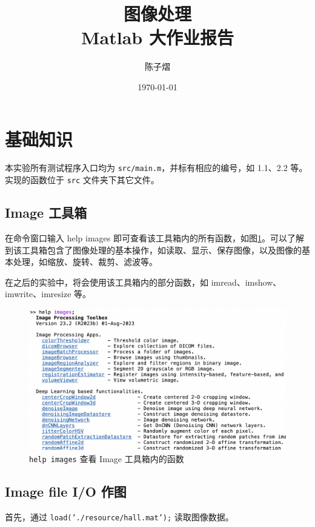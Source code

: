 \documentclass[a4paper]{article}  %
\begin{document}
\title{\textbf{图像处理}\\Matlab 大作业报告}  %
\author{陈子熠}
\date{\today}
\maketitle

\tableofcontents

\newpage

\section{基础知识}

本实验所有测试程序入口均为 \texttt{src/main.m}，并标有相应的编号，如 1.1、2.2 等。实现的函数位于 \texttt{src} 文件夹下其它文件。

\subsection{Image 工具箱}

在命令窗口输入 help images 即可查看该工具箱内的所有函数，如图\ref{fig:1_1_help_images}。可以了解到该工具箱包含了图像处理的基本操作，如读取、显示、保存图像，以及图像的基本处理，如缩放、旋转、裁剪、滤波等。

在之后的实验中，将会使用该工具箱内的部分函数，如 imread、imshow、imwrite、imresize 等。

\begin{figure}[ht]
    \centering
    \includegraphics[width=.8\textwidth]{asserts/1_1_help_images.png}
    \caption{
        \texttt{help images} 查看 Image 工具箱内的函数
    }\label{fig:1_1_help_images}
\end{figure}


\subsection{Image file I/O 作图}

首先，通过 \texttt{load('./resource/hall.mat');} 读取图像数据。
\end{document}
